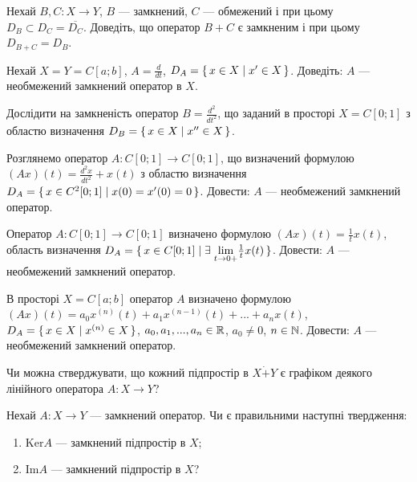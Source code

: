 \begin{exercise}\label{N:2_1_6}
    Нехай $B, C : X \to Y$, $B$ --- замкнений, $C$ --- обмежений і при цьому $D_B \subset D_C = \overline{D_C}$.
    Доведіть, що оператор $B + C$ є замкненим і при цьому $D_{B+C} = D_B$.
\end{exercise}

\begin{exercise}
    Нехай $X = Y = C[a; b]$, $A = \frac{d}{dt}$, $D_A = \set{x \in X \mid x^\prime \in X}$.
    Доведіть: $A$ --- необмежений замкнений оператор в $X$.
\end{exercise}

\begin{exercise}
    Дослідити на замкненість оператор $B = \frac{d^2}{d t^2}$, що заданий в просторі $X = C[0;1]$
    з областю визначення $D_B = \set{x \in X \mid x^{\prime\prime} \in X}$.
\end{exercise}

\begin{exercise}
    Розглянемо оператор $A : C[0;1] \to C[0;1]$, що визначений формулою $(Ax)(t) = \frac{d^2x }{d t^2} + x(t)$
    з областю визначення $D_A = \set{x \in C^2 [0;1] \mid x(0) = x^\prime(0) = 0}$.
    Довести: $A$ --- необмежений замкнений оператор.
\end{exercise}

\begin{exercise}\label{N:2_1_10}
    Оператор $A : C[0;1] \to C[0;1]$ визначено формулою $(Ax)(t) = \frac{1}{t} x(t)$,
    область визначення $D_A = \set{x \in C[0;1] \mid \exists \; \underset{t \to 0+}{\lim} \frac{1}{t} x(t)}$.
    Довести: $A$ --- необмежений замкнений оператор.
\end{exercise}

\begin{exercise*}
    В просторі $X = C[a;b]$ оператор $A$ визначено формулою $(Ax)(t) = a_0 x^{(n)}(t) + a_1 x^{(n-1)}(t) + ... + a_n x(t)$, 
    $D_A = \set{x \in X \mid x^{(n)} \in X}$, $a_0, a_1, ..., a_n \in \mathbb{R}$, $a_0 \neq 0$, $n \in \mathbb{N}$.
    Довести: $A$ --- необмежений замкнений оператор.
\end{exercise*}

\begin{exercise}
    Чи можна стверджувати, що кожний підпростір в $X \dot{+} Y$ є графіком деякого лінійного оператора $A : X \to Y$?
\end{exercise}

\begin{exercise}
    Нехай $A : X \to Y$ --- замкнений оператор. Чи є правильними наступні твердження:
    \begin{enumerate}
        \item $\mathrm{Ker} A$ --- замкнений підпростір в $X$;
        \item $\mathrm{Im} A$ --- замкнений підпростір в $X$?
    \end{enumerate}
\end{exercise}


